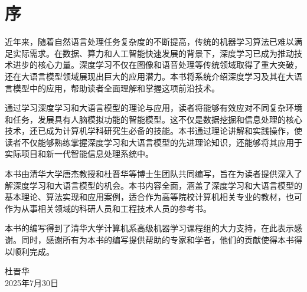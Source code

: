 \chapter*{序}

近年来，随着自然语言处理任务复杂度的不断提高，传统的机器学习算法已难以满足实际需求。在数据、算力和人工智能快速发展的背景下，深度学习已成为推动技术进步的核心力量。深度学习不仅在图像和语音处理等传统领域取得了重大突破，还在大语言模型领域展现出巨大的应用潜力。本书将系统介绍深度学习及其在大语言模型中的应用，帮助读者全面理解和掌握这项前沿技术。

通过学习深度学习和大语言模型的理论与应用，读者将能够有效应对不同复杂环境和任务，发展具有人脑模拟功能的智能模型。这不仅是数据挖掘和信息处理的核心技术，还已成为计算机学科研究生必备的技能。本书通过理论讲解和实践操作，使读者不仅能够熟练掌握深度学习和大语言模型的先进理论知识，还能够将其应用于实际项目和新一代智能信息处理系统中。

本书由清华大学唐杰教授和杜晋华等博士生团队共同编写，旨在为读者提供深入了解深度学习和大语言模型的机会。本书内容全面，涵盖了深度学习和大语言模型的基本理论、算法实现和应用案例，适合作为高等院校计算机相关专业的教材，也可作为从事相关领域的科研人员和工程技术人员的参考书。

本书的编写得到了清华大学计算机系高级机器学习课程组的大力支持，在此表示感谢。同时，感谢所有为本书的编写提供帮助的专家和学者，他们的贡献使得本书得以顺利完成。

\begin{flushright}
    杜晋华\\
    2025年7月30日
\end{flushright}